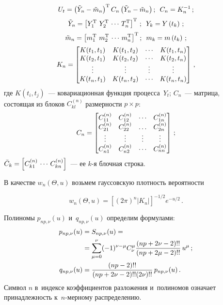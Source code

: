 \begin{multicols}{2}
    \noindent
\begin{gather*}
U_t=\left(\tilde Y_n-\tilde     m_n\right)^{\mathrm{T}}
C_n\left(\tilde Y_n-\tilde m_n\right);\enskip C_n=K_n^{-1}\,;\\[2pt]
\tilde  Y_n=\left[Y_1^{\mathrm{T}}\,\,Y_2^{\mathrm{T}}\,\cdots\,T_n^{\mathrm{T}}\right]^{\mathrm{T}}\,;
\enskip
    Y_k=Y\left(t_k\right)\,;\\[2pt]
\tilde
    m_n=\left[ m_1^{\mathrm{T}}\,\,m_2^{\mathrm{T}}\,\cdots\,m_n^{\mathrm{T}}\right]^{\mathrm{T}};
    \enskip m_k=m\left(t_k\right)\,;
   \\[2pt]
K_n=\begin{bmatrix} 
K(t_1,t_1) &K(t_1,t_2) &\cdots     &K(t_1,t_n)\\ 
    K(t_2,t_1) &K(t_2,t_2) &\cdots &K(t_2,t_n)\\
    \vdots &\vdots &\vdots &\vdots\\
    K(t_n,t_1) &K(t_n,t_2) &\cdots &K(t_n,t_n)\end{bmatrix}
\,,
\end{gather*}
где $K(t_i,t_j)$~--- ковариационная функция процесса~$Y_t$;
$C_n$~--- матрица, состоящая из блоков $C_{kl}^{(n)}$ размерности
$p\times p$:
    \begin{equation*}
    C_n=\begin{bmatrix}
     C_{11}^{(n)} &C_{12}^{(n)} &\cdots &C_{1n}^{(n)}\cr C_{21}^{(n)} &C_{22}^{(n)} &\ldots
    &C_{2n}^{(n)}\\
    \vdots &\vdots &\vdots &\vdots\\
    C_{n1}^{(n)} &C_{n2}^{(n)} &\cdots &C_{nn}^{(n)}
\end{bmatrix}\,;
\end{equation*}
 $\bar C_k \hm=\left[C_{k1}^{(n)}\,\cdots\,C_{kn}^{(n)}\right]$~--- 
ее $k$-я блочная строка.

В качестве $w_n(\Theta,u)$ возьмем гауссовскую плотность вероятности

    \vspace*{-2pt}
    
\noindent
\begin{equation*}
w_n(\Theta,u)=\left[(2\pi)^n\vert
    K_n\vert\right]^{-1/2}e^{-u/2}\,.
    \end{equation*}
    
    
    \noindent
 Полиномы $p_{np,\nu}(u)$ и~$q_{np,\nu}(u)$  определим форму\-лами:
\begin{align*}
p_{np,\nu}(u)&=S_{np,\nu}(u)={}\notag\\
&{}=\sum\limits_{\mu=0}^{\nu} (-1)^{\nu-\mu}C_{\nu}^{\mu}
    \displaystyle\frac{\displaystyle (np+2\nu-2)!!\mathstrut}{\displaystyle (np+2\mu-2)!!\mathstrut}\,u^{\mu}\,;
    \\
q_{np,\nu}(u)&=\displaystyle\frac{\displaystyle (np-2)!!\mathstrut}{\displaystyle (np+2\nu-2)!!(2\nu)!!\mathstrut}\,p_{np,\nu}(u)\,.
    \end{align*}
Символ $n$ в~индексе коэффициентов разложения и~полиномов означает
принадлежность к~$n$-мер\-но\-му распределению.


\end{multicols}
